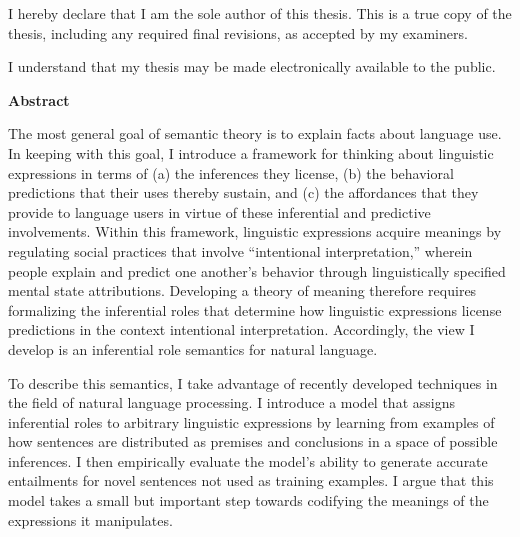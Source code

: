 \cleardoublepage %
 


  \noindent
I hereby declare that I am the sole author of this thesis. This is a true copy of the thesis, including any required final revisions, as accepted by my examiners.

  \bigskip
  
  \noindent
I understand that my thesis may be made electronically available to the public.

\cleardoublepage


\begin{center}\textbf{Abstract}\end{center}

The most general goal of semantic theory is to explain facts about language use. In keeping with this goal, I introduce a framework for thinking about linguistic expressions in terms of (a) the inferences they license, (b) the behavioral predictions that their uses thereby sustain, and (c) the affordances that they provide to language users in virtue of these inferential and predictive involvements. Within this framework, linguistic expressions acquire meanings by regulating social practices that involve ``intentional interpretation,'' wherein people explain and predict one another's behavior through linguistically specified mental state attributions. Developing a theory of meaning therefore requires formalizing the inferential roles that determine how linguistic expressions license predictions in the context intentional interpretation. Accordingly, the view I develop is an inferential role semantics for natural language.

To describe this semantics, I take advantage of recently developed techniques in the field of natural language processing. I introduce a model that assigns inferential roles to arbitrary linguistic expressions by learning from examples of how sentences are distributed as premises and conclusions in a space of possible inferences. I then empirically evaluate the model's ability to generate accurate entailments for novel sentences not used as training examples. I argue that this model takes a small but important step towards codifying the meanings of the expressions it manipulates.

